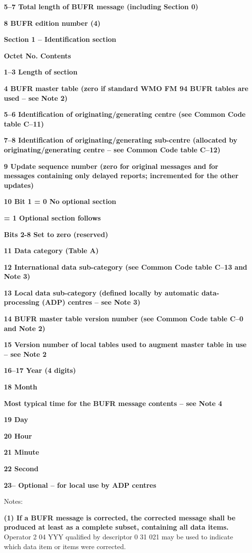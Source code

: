 \textbf{5--7 Total length of BUFR message (including Section 0)}

\textbf{8 BUFR edition number (4)}

\textbf{Section 1 -- Identification section}

\textbf{Octet No. Contents}

\textbf{1--3 Length of section}

\textbf{4 BUFR master table (zero if standard WMO FM 94 BUFR tables are used -- see Note 2)}

\textbf{5--6 Identification of originating/generating centre (see Common Code table C--11)}

\textbf{7--8 Identification of originating/generating sub-centre (allocated by originating/generating centre -- see Common Code table C--12)}

\textbf{9 Update sequence number (zero for original messages and for messages containing only delayed reports; incremented for the other updates)}

\textbf{10 Bit 1 = 0 No optional section}

\textbf{= 1 Optional section follows}

\textbf{Bits 2-8 Set to zero (reserved)}

\textbf{11 Data category (Table A)}

\textbf{12 International data sub-category (see Common Code table C--13 and Note 3)}

\textbf{13 Local data sub-category (defined locally by automatic data-processing (ADP) centres -- see Note 3)}

\textbf{14 BUFR master table version number (see Common Code table C--0 and Note 2)}

\textbf{15 Version number of local tables used to augment master table in use -- see Note 2}

\textbf{16--17 Year (4 digits)}

\textbf{18 Month}

\textbf{Most typical time for the BUFR message contents -- see Note 4}

\textbf{19 Day}

\textbf{20 Hour}

\textbf{21 Minute}

\textbf{22 Second}

\textbf{23-- Optional -- for local use by ADP centres}

Notes:

\textbf{(1) If a BUFR message is corrected, the corrected message shall be produced at least as a complete subset, containing all data items.} Operator 2 04 YYY qualified by descriptor 0 31 021 may be used to indicate which data item or items were corrected.

